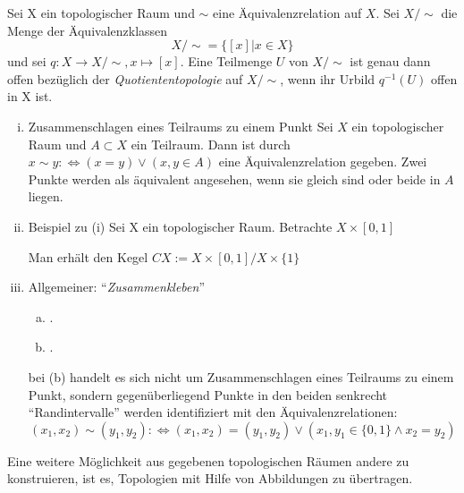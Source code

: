 \documentclass[a4paper,10pt]{scrartcl}
\renewcommand{\equiv}{\Longleftrightarrow}
\begin{document}
\begin{df}
Sei X ein topologischer Raum und $\sim$ eine Äquivalenzrelation auf $ X $.  Sei $X/\sim$ die Menge der Äquivalenzklassen 
\[
X/\sim=\{[x]|x\in X\}
\]
und sei $ q: X\to X/\sim, x\mapsto [x] $. Eine Teilmenge $ U $ von $ X/\sim $ ist genau dann offen bezüglich der \emph{Quotiententopologie} auf $ X/\sim $, wenn ihr Urbild $ q^{-1}(U) $ offen in X ist.
\end{df}

\begin{ex*}
\begin{enumerate}[(i)]
\item \begin{seg}{Zusammenschlagen eines Teilraums zu einem Punkt}
Sei $ X $ ein topologischer Raum und $ A\subset X $ ein Teilraum. Dann ist durch $ x \sim y :\equiv (x=y)\lor (x,y\in A) $ eine Äquivalenzrelation gegeben.  Zwei Punkte werden als äquivalent angesehen, wenn sie gleich sind oder beide in $ A $ liegen.
\end{seg}
\item \begin{seg}{Beispiel zu (i)}
Sei X ein topologischer Raum. Betrachte $ X\times [0,1] $
\begin{figure}[H]
\centering
 \fixme[fig9]
\caption{}
\end{figure}
Man erhält den Kegel $CX:=X\times[0,1]/X\times\{1\}$
\end{seg}
\item Allgemeiner: "`\emph{Zusammenkleben}"'
\begin{enumerate}[(a)]
\item .
\begin{figure}[H]
\centering
 \fixme[fig10]
\caption{}
\end{figure}
\item .
\begin{figure}[H]
\centering
 \fixme[fig11]
\caption{}
\end{figure}
\end{enumerate}
bei (b) handelt es sich nicht um Zusammenschlagen eines Teilraums zu einem Punkt, sondern gegenüberliegend Punkte in den beiden senkrecht "`Randintervalle"' werden identifiziert mit den Äquivalenzrelationen: \fixme[nachschauen]
\[
(x_1,x_2)\sim (y_1,y_2):\equiv (x_1,x_2)=(y_1,y_2)\lor (x_1,y_1 \in \{0,1\} \land x_2 =y_2)
\]
\end{enumerate}
\end{ex*}
Eine weitere Möglichkeit aus gegebenen topologischen Räumen andere zu konstruieren, ist es, Topologien mit Hilfe von Abbildungen zu übertragen.
\end{document}
